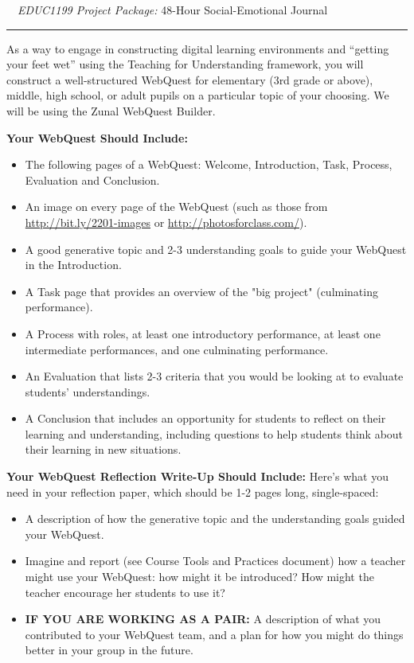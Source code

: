 \documentclass[10pt]{article}
\newcommand{\dueDate}[1]{\textbf{\textcolor{fsuMaroon}{#1}}}
\newcommand{\subHead}[1]{\noindent\textbf{\textsf{\textcolor{fsuMaroon}{#1}}}}
\begin{document}
\begin{center}
\noindent\Large\dueDate{\faBriefcase}~~\textsf{\textit{EDUC1199 Project Package:} 48-Hour Social-Emotional Journal}~~\dueDate{\faBook}\normalsize\\
\rule{5.5in}{1pt}
\end{center}

As a way to engage in constructing digital learning environments and “getting your feet wet” using the Teaching for Understanding framework, you will construct a well-structured WebQuest for elementary (3rd grade or above), middle, high school, or adult pupils on a particular topic of your choosing. We will be using the Zunal WebQuest Builder.

\subHead{Your WebQuest Should Include:}
\begin{itemize}
	\itemsep-0.5em
	\item The following pages of a WebQuest: Welcome, Introduction, Task, Process, Evaluation and Conclusion.
	\item An image on every page of the WebQuest (such as those from \url{http://bit.ly/2201-images} or \url{http://photosforclass.com/}).
	\item A good generative topic and 2-3 understanding goals to guide your WebQuest in the Introduction.
	\item A Task page that provides an overview of the "big project" (culminating performance).
	\item A Process with roles, at least one introductory performance, at least one intermediate performances, and one culminating performance.
	\item An Evaluation that lists 2-3 criteria that you would be looking at to evaluate students' understandings.
	\item A Conclusion that includes an opportunity for students to reflect on their learning and understanding, including questions to help students think about their learning in new situations.

\end{itemize}

\subHead{Your WebQuest Reflection Write-Up Should Include:}
Here's what you need in your reflection paper, which should be 1-2 pages long, single-spaced:

\begin{itemize}
	\itemsep-0.5em
	\item A description of how the generative topic and the understanding goals guided your WebQuest.
	\item Imagine and report (see Course Tools and Practices document) how a teacher might use your WebQuest: how might it be introduced? How might the teacher encourage her students to use it?
	\item \textbf{IF YOU ARE WORKING AS A PAIR:} A description of what you contributed to your WebQuest team, and a plan for how you might do things better in your group in the future.
\end{itemize}
\end{document}
